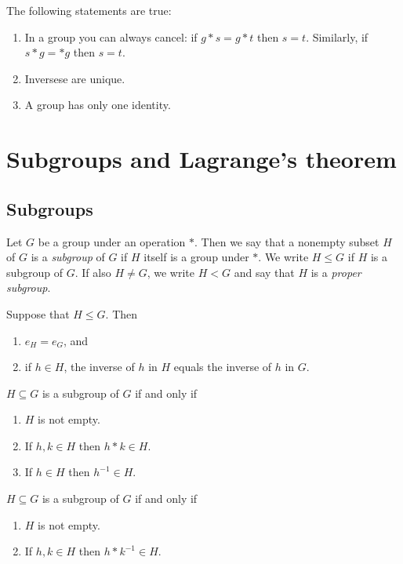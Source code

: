 \documentclass{article}
\begin{document}
\setcounter{theorem}{7}
\begin{corollary}
	The following statements are true:
	\begin{enumerate}
		\item In a group you can always cancel: if $g* s=g* t$
		      then $s=t$. Similarly, if $s* g=* g$ then $s=t$.
		\item Inversese are unique.
		\item A group has only one identity.
	\end{enumerate}
\end{corollary}


\section{Subgroups and Lagrange's theorem}


\subsection{Subgroups}

\begin{definition}
	Let $G$ be a group under an operation $*$. Then we say that a nonempty
	subset $H$ of $G$ is a \emph{subgroup} of $G$ if $H$ itself is a group under $*$.
	We write $H\leq G$ if $H$ is a subgroup of $G$. If also $H\not=G$, we write
	$H<G$ and say that $H$ is a \emph{proper subgroup}.
\end{definition}

\begin{lemma}
	Suppose that $H\leq G$. Then
	\begin{enumerate}
		\item $e_H = e_G$, and
		\item if $h\in H$, the inverse of $h$ in $H$ equals the inverse of $h$ in $G$.
	\end{enumerate}
\end{lemma}

\begin{theorem}
	$H\subseteq G$ is a subgroup of $G$ if and only if
	\begin{enumerate}[label=S\arabic*.]
		\item $H$ is not empty.
		\item If $h,k\in H$ then $h*k\in H$.
		\item If $h\in H$ then $h^{-1}\in H$.
	\end{enumerate}
\end{theorem}

\begin{theorem}
	$H\subseteq G$ is a subgroup of $G$ if and only if
	\begin{enumerate}[label=$\widetilde{\text{S\arabic*}}$.]
		\item $H$ is not empty.
		\item If $h,k\in H$ then $h*k^{-1}\in H$.
	\end{enumerate}
\end{theorem}
\end{document}
